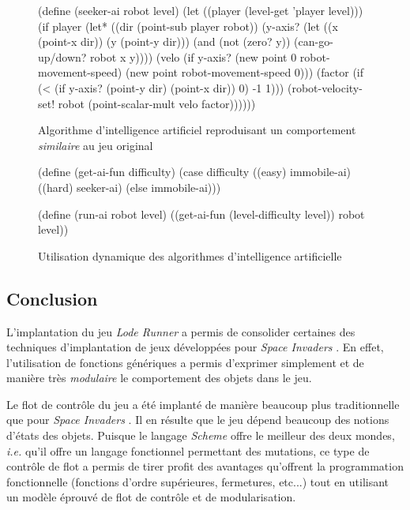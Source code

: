 \documentclass[12pt,twoside,letterpaper,francais]{book}
\newcommand{\ie}{{\textit{i.e. }}}
\newcommand{\lr}{{\textit{Lode Runner }}}
\newcommand{\si}{{\textit{Space Invaders }}}
\newcommand{\Schemelang}{{\textit{Scheme }}}
\begin{document}
\begin{figure}[htb!]
  \begin{schemecode}
(define (seeker-ai robot level)
  (let ((player (level-get 'player level)))
    (if player
        (let* ((dir (point-sub player robot))
               (y-axis? (let ((x (point-x dir)) (y (point-y dir)))
                          (and (not (zero? y))
                               (can-go-up/down? robot x y))))
               (velo (if y-axis?
                         (new point 0 robot-movement-speed)
                         (new point robot-movement-speed 0)))
               (factor (if (< (if y-axis? (point-y dir) (point-x dir)) 0)
                           -1
                           1)))
          (robot-velocity-set! robot (point-scalar-mult velo factor))))))
  \end{schemecode}
  \caption{Algorithme d'intelligence artificiel reproduisant un
    comportement \emph{similaire} au jeu original}
  \label{Exp:ai-seek}
\end{figure}

\begin{figure}[htb!]
  \begin{schemecode}
(define (get-ai-fun difficulty)
  (case difficulty
    ((easy) immobile-ai)
    ((hard) seeker-ai)
    (else immobile-ai)))

(define (run-ai robot level)
  ((get-ai-fun (level-difficulty level)) robot level))
  \end{schemecode}
  \caption{Utilisation dynamique des algorithmes d'intelligence
    artificielle}
  \label{Exp:dyn-ai}
\end{figure}


\FloatBarrier
\subsection{Conclusion}
L'implantation du jeu \lr a permis de consolider certaines des
techniques d'implantation de jeux développées pour \si. En effet,
l'utilisation de fonctions génériques a permis d'exprimer simplement
et de manière très \emph{modulaire} le comportement des objets dans le
jeu.

Le flot de contrôle du jeu a été implanté de manière beaucoup plus
traditionnelle que pour \si. Il en résulte que le jeu dépend beaucoup
des notions d'états des objets. Puisque le langage \Schemelang offre
le meilleur des deux mondes, \ie qu'il offre un langage fonctionnel
permettant des mutations, ce type de contrôle de flot a permis de
tirer profit des avantages qu'offrent la programmation fonctionnelle
(fonctions d'ordre supérieures, fermetures, etc...) tout en utilisant
un modèle éprouvé de flot de contrôle et de modularisation.
\end{document}
